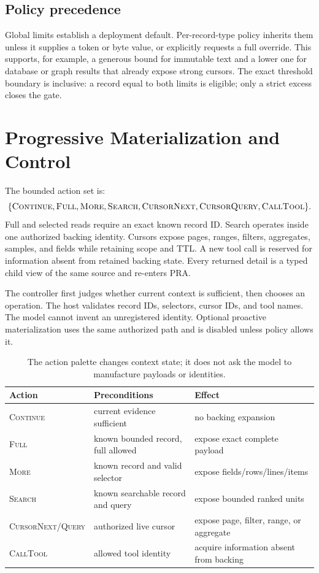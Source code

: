 \documentclass[11pt]{article}
\begin{document}
\subsection{Policy precedence}

Global limits establish a deployment default. Per-record-type policy inherits
them unless it supplies a token or byte value, or explicitly requests a full
override. This supports, for example, a generous bound for immutable text and a
lower one for database or graph results that already expose strong cursors.
The exact threshold boundary is inclusive: a record equal to both limits is
eligible; only a strict excess closes the gate.

\section{Progressive Materialization and Control}

The bounded action set is:
\[
\{\textsc{Continue},\textsc{Full},\textsc{More},\textsc{Search},
\textsc{CursorNext},\textsc{CursorQuery},\textsc{CallTool}\}.
\]
Full and selected reads require an exact known record ID. Search operates
inside one authorized backing identity. Cursors expose pages, ranges, filters,
aggregates, samples, and fields while retaining scope and TTL. A new tool call
is reserved for information absent from retained backing state. Every returned
detail is a typed child view of the same source and re-enters PRA.

The controller first judges whether current context is sufficient, then chooses
an operation. The host validates record IDs, selectors, cursor IDs, and tool
names. The model cannot invent an unregistered identity. Optional proactive
materialization uses the same authorized path and is disabled unless policy
allows it.

\begin{table}[t]
\centering
\small
\begin{tabularx}{\linewidth}{@{}lXX@{}}
\toprule
Action & Preconditions & Effect\\
\midrule
\textsc{Continue} & current evidence sufficient & no backing expansion\\
\textsc{Full} & known bounded record, full allowed & expose exact complete payload\\
\textsc{More} & known record and valid selector & expose fields/rows/lines/items\\
\textsc{Search} & known searchable record and query & expose bounded ranked units\\
\textsc{CursorNext/Query} & authorized live cursor & expose page, filter, range, or aggregate\\
\textsc{CallTool} & allowed tool identity & acquire information absent from backing\\
\bottomrule
\end{tabularx}
\caption{The action palette changes context state; it does not ask the model to
manufacture payloads or identities.}
\label{tab:actions}
\end{table}
\end{document}
